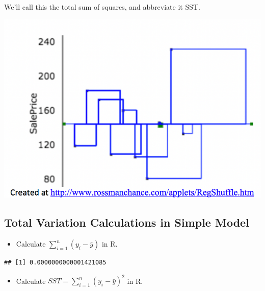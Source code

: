 \documentclass[]{book}
\newenvironment{Shaded}{\begin{snugshade}}{\end{snugshade}}
\newcommand{\KeywordTok}[1]{\textcolor[rgb]{0.13,0.29,0.53}{\textbf{#1}}}
\newcommand{\DecValTok}[1]{\textcolor[rgb]{0.00,0.00,0.81}{#1}}
\newcommand{\StringTok}[1]{\textcolor[rgb]{0.31,0.60,0.02}{#1}}
\newcommand{\OperatorTok}[1]{\textcolor[rgb]{0.81,0.36,0.00}{\textbf{#1}}}
\newcommand{\NormalTok}[1]{#1}
\providecommand{\tightlist}{%
  \setlength{\itemsep}{0pt}\setlength{\parskip}{0pt}}
\begin{document}
We'll call this the total sum of squares, and abbreviate it SST.

\includegraphics[width=13.12in,height=0.65\textheight]{SST}

\subsection{Total Variation Calculations in Simple
Model}\label{total-variation-calculations-in-simple-model}

\begin{itemize}
\tightlist
\item
  Calculate \(\displaystyle\sum_{i=1}^n (y_i - \bar{y})\) in R.
\end{itemize}

\begin{Shaded}
\end{Shaded}

\begin{verbatim}
## [1] 0.0000000000001421085
\end{verbatim}

\begin{itemize}
\tightlist
\item
  Calculate \(SST = \displaystyle\sum_{i=1}^n (y_i - \bar{y})^2\) in R.
\end{itemize}

\begin{Shaded}
\end{Shaded}
\end{document}
